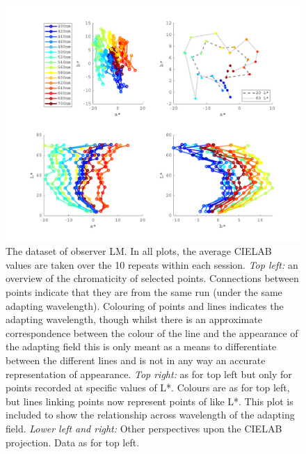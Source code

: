 \begin{figure}[htbp]
\includegraphics[max width=1.2\textwidth, center]{figs/LargeSphere/LMdataOverview.pdf}
\caption{The dataset of observer LM. In all plots, the average CIELAB values are taken over the 10 repeats within each session. \emph{Top left:} an overview of the chromaticity of selected points. Connections between points indicate that they are from the same run (under the same adapting wavelength). Colouring of points and lines indicates the adapting wavelength, though whilst there is an approximate correspondence between the colour of the line and the appearance of the adapting field this is only meant as a means to differentiate between the different lines and is not in any way an accurate representation of appearance. \emph{Top right:} as for top left but only for points recorded at specific values of L*. Colours are as for top left, but lines linking points now represent points of like L*. This plot is included to show the relationship across wavelength of the adapting field. \emph{Lower left and right:} Other perspectives upon the CIELAB projection. Data as for top left.}
\label{fig:overviewLM}
\end{figure}

